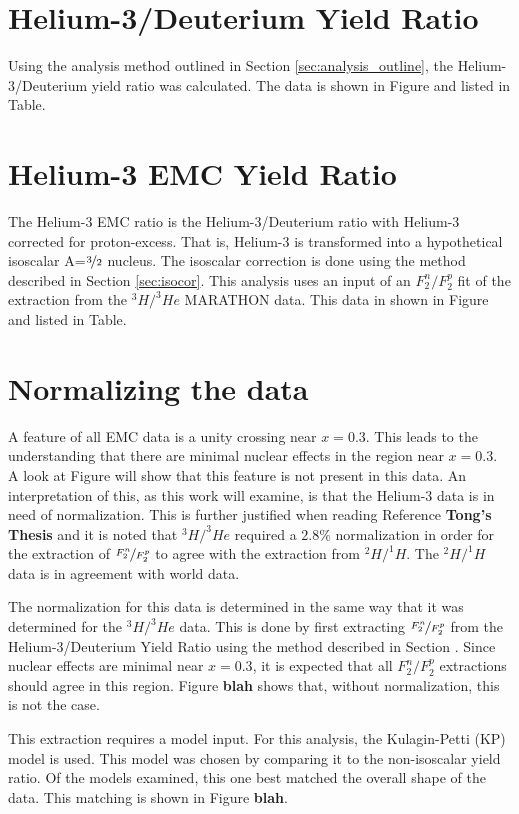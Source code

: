\section{Helium-3/Deuterium Yield Ratio}

Using the analysis method outlined in Section \ref{sec:analysis_outline}, the Helium-3/Deuterium yield ratio was calculated. The data is shown in Figure and listed in Table.

\section{Helium-3 EMC Yield Ratio}

The Helium-3 EMC ratio is the Helium-3/Deuterium ratio with Helium-3 corrected for proton-excess. That is, Helium-3 is transformed into a hypothetical isoscalar A=$\nicefrac{3}{2}$ nucleus. The isoscalar correction is done using the method described in Section \ref{sec:isocor}. This analysis uses an input of an $F_2^n/F_2^p$ fit of the extraction from the $^3H/^3He$ MARATHON data. This data in shown in Figure and listed in Table.

\section{Normalizing the data}

A feature of all EMC data is a unity crossing near $x=0.3$. This leads to the understanding that there are minimal nuclear effects in the region near $x=0.3$. A look at Figure will show that this feature is not present in this data. An interpretation of this, as this work will examine, is that the Helium-3 data is in need of normalization. This is further justified when reading Reference \textbf{Tong's Thesis} and it is noted that $^3H/^3He$ required a $2.8\%$ normalization in order for the extraction of $\nicefrac{F_2^n}{F_2^p}$ to agree with the extraction from $^2H/^1H$. The $^2H/^1H$ data is in agreement with world data.

The normalization for this data is determined in the same way that it was determined for the $^3H/^3He$ data. This is done by first extracting $\nicefrac{F_2^n}{F_2^p}$ from the Helium-3/Deuterium Yield Ratio using the method described in Section \label{sec:F2ratio}. Since nuclear effects are minimal near $x=0.3$, it is expected that all $F_2^n/F_2^p$ extractions should agree in this region. Figure \textbf{blah} shows that, without normalization, this is not the case.

This extraction requires a model input. For this analysis, the Kulagin-Petti (KP) model is used. This model was chosen by comparing it to the non-isoscalar yield ratio. Of the models examined, this one best matched the overall shape of the data. This matching is shown in Figure \textbf{blah}.

